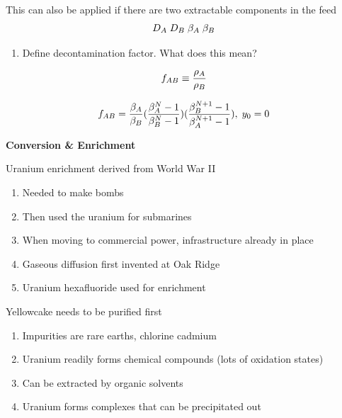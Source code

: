 \documentclass[aspectratio=1610,pdftex,dvipsnames,compress,xcolor={dvipsnames}]{beamer}
\begin{document}
\begin{frame}{This can also be applied if there are two extractable components in the feed}
    \begin{equation}
        \LARGE
        D_A \; D_B \; \beta_A \; \beta_B
    \end{equation}
    
    \vspace*{\fill}

    \begin{enumerate}[topsep=0pt,itemsep=18pt,leftmargin=*,label=(\arabic*)]
        \item[]Define decontamination factor. What does this mean?
    \end{enumerate}

    \vspace*{\fill}

    \begin{equation}
        \LARGE
        f_{AB} \equiv \frac{\rho_A}{\rho_B}
    \end{equation}

    \begin{equation}
        \LARGE
        f_{AB} = \frac{\beta_A}{\beta_B}(\frac{\beta^N_A - 1}{\beta^N_B - 1})(\frac{\beta^{N+1}_B - 1}{\beta^{N+1}_A - 1}), \; y_0 = 0
    \end{equation}
\end{frame}


\begin{frame}[plain]{}
    \centering\LARGE\textbf{Conversion \& Enrichment}
\end{frame}


\addtocounter{framenumber}{-1} 
\begin{frame}{Uranium enrichment derived from World War II}
    \begin{enumerate}[topsep=0pt,itemsep=21pt,leftmargin=*,label=(\arabic*)]
        \item[]Needed to make bombs
        \item[]Then used the uranium for submarines 
        \item[]When moving to commercial power, infrastructure already in place
        \item[]Gaseous diffusion first invented at Oak Ridge
        \item[]Uranium hexafluoride used for enrichment
    \end{enumerate}
\end{frame}


\begin{frame}{Yellowcake needs to be purified first}
    \begin{enumerate}[topsep=0pt,itemsep=21pt,leftmargin=*,label=(\arabic*)]
        \item[]Impurities are rare earths, chlorine cadmium
        \item[]Uranium readily forms chemical compounds (lots of oxidation states)
        \item[]Can be extracted by organic solvents
        \item[]Uranium forms complexes that can be precipitated out
    \end{enumerate}
\end{frame}
\end{document}
